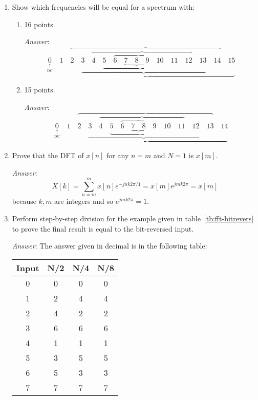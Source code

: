 \begin{enumerate}

\item Show which frequencies will be equal for a spectrum
  with:\label{it:ch5ex4}
  \begin{enumerate}
  \item 16 points.

    \textit{Answer}:
    \begin{equation*}
      \underset{\underset{\text{DC}}{\uparrow}}{0} \quad \underbrace{1
        \quad \overbrace{2 \quad \underbrace{3 \quad \overbrace{4
              \quad \underbrace{5 \quad \overbrace{6 \quad
                  \underbrace{7 \quad 8 \quad 9} \quad 10} \quad 11}
              \quad 12} \quad 13} \quad 14} \quad 15}
    \end{equation*}

  \item 15 points.

    \textit{Answer}:
    \begin{equation*}
      \underset{\underset{\text{DC}}{\uparrow}}{0} \quad \underbrace{1
        \quad \overbrace{2 \quad \underbrace{3 \quad \overbrace{4
              \quad \underbrace{5 \quad \overbrace{6 \quad
                  \underbrace{7 \quad 8} \quad 9} \quad 10} \quad 11}
            \quad 12} \quad 13} \quad 14}
    \end{equation*}
  \end{enumerate}

\item Prove that the DFT of $x[n]$ for any $n=m$ and $N=1$ is
  $x[m]$.\label{it:ch5ex5}

  \textit{Answer}:
  \begin{equation*}
    X[k] = \sum_{n=m}^{m}x[n]e^{-jnk2\pi/1}=x[m]e^{jmk2\pi}=x[m]
  \end{equation*}
  because $k, m$ are integers and so $e^{jmk2\pi}=1$.

\item Perform step-by-step division for the example given in
  table~\ref{tb:fft-bitrevers} to prove the final result is equal to the
  bit-reversed input.\label{it:ch5ex6}

  \textit{Answer}: The answer given in decimal
  is in the following table:
  \begin{center}
    \begin{tabular}{|c|c|c|c|} \hline
      Input & N/2 & N/4 & N/8\\ \hline\hline
      0 & 0 & 0 & 0\\ \cline{4-4}
      1 & 2 & 4 & 4\\ \cline{3-4}
      2 & 4 & 2 & 2\\ \cline{4-4}
      3 & 6 & 6 & 6\\ \cline{2-4}
      4 & 1 & 1 & 1\\ \cline{4-4}
      5 & 3 & 5 & 5\\ \cline{3-4}
      6 & 5 & 3 & 3\\ \cline{4-4}
      7 & 7 & 7 & 7\\ \hline
    \end{tabular}
  \end{center}


\end{enumerate}
